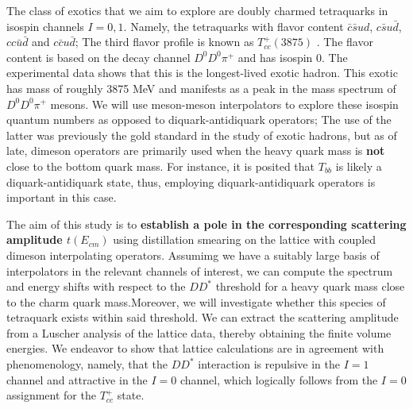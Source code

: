 The class of exotics that we aim to explore are doubly charmed tetraquarks in isospin channels $I=0,1$. Namely, the tetraquarks with flavor content $\bar c\bar s ud$, $c\bar s u\bar d$, $cc\bar u\bar d$ and $c\bar c u\bar d$; The third flavor profile is known as $T_{cc}^+(3875)$ \cite{LHCb:2021vvq}. The flavor content is based on the decay channel $D^0D^0\pi^+$ and has isospin 0. The experimental data shows that this is the longest-lived exotic hadron. This exotic has mass of roughly 3875 MeV and manifests as a peak in the mass spectrum of $D^0D^0\pi^+$ mesons.  We will use meson-meson interpolators to explore these isospin quantum numbers as opposed to diquark-antidiquark operators; The use of the latter was previously the gold standard in the study of exotic hadrons, but as of late, dimeson operators are primarily used when the heavy quark mass is \textbf{not} close to the bottom quark mass. For instance, it is posited that $T_{bb}$ is likely a diquark-antidiquark state, thus, employing diquark-antidiquark operators is important in this case.  

The aim of this study is to \textbf{establish a pole in the corresponding scattering amplitude $t(E_{cm})$} using distillation smearing on the lattice with coupled dimeson interpolating operators. Assumimg we have a suitably large basis of interpolators in the relevant channels of interest, we can compute the spectrum and energy shifts with respect to the $DD^*$ threshold for a heavy quark mass close to the charm quark mass.Moreover, we will investigate whether this species of tetraquark exists within said threshold. We can extract the scattering amplitude from a Luscher analysis of the lattice data, thereby obtaining the finite volume energies. We endeavor to show that lattice calculations are in agreement with phenomenology, namely, that the $DD^*$ interaction is repulsive in the $I=1$ channel and attractive in the $I=0$ channel, which logically follows from the $I=0$ assignment for the $T_{cc}^+$ state. 



